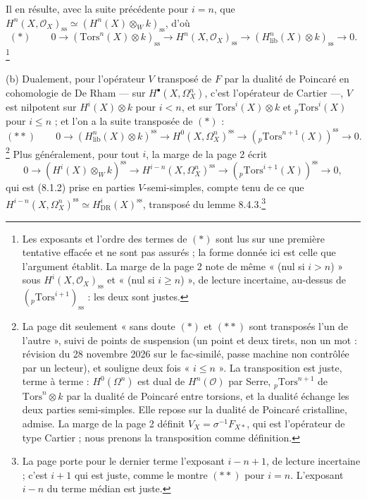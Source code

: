 \documentclass[11pt,a4paper]{article}
\begin{document}
Il en résulte, avec la suite précédente pour $i = n$, que
$H^{n}(X, \mathcal{O}_{X})_{\mathrm{ss}} \simeq (H^{n}(X) \otimes_{W}
k)_{\mathrm{ss}}$, d'où
\[
(*) \qquad 0 \to (\mathrm{Tors}^{n}(X) \otimes k)_{\mathrm{ss}}
\to H^{n}(X, \mathcal{O}_{X})_{\mathrm{ss}}
\to (H^{n}_{\mathrm{lib}}(X) \otimes k)_{\mathrm{ss}} \to 0 .
\]
\footnote{Les exposants et l'ordre des termes de $(*)$ sont lus sur une
première tentative effacée et ne sont pas assurés ; la forme donnée ici est
celle que l'argument établit. La marge de la page 2 note de même
« (nul si $i > n$) » sous $H^{i}(X, \mathcal{O}_{X})_{\mathrm{ss}}$ et
« (nul si $i \geq n$) », de lecture incertaine, au-dessus de
$({}_{p}\mathrm{Tors}^{i+1})_{\mathrm{ss}}$ : les deux sont justes.}

(b) Dualement, pour l'opérateur $V$ transposé de $F$ par la dualité de
Poincaré en cohomologie de De Rham --- sur $H^{\bullet}(X, \Omega^{n}_{X})$,
c'est l'opérateur de Cartier ---, $V$ est nilpotent sur
$H^{i}(X) \otimes k$ pour $i < n$, et sur $\mathrm{Tors}^{i}(X) \otimes k$ et
${}_{p}\mathrm{Tors}^{i}(X)$ pour $i \leq n$ ; et l'on a la suite transposée
de $(*)$ :
\[
(**) \qquad 0 \to (H^{n}_{\mathrm{lib}}(X) \otimes k)^{\mathrm{ss}}
\to H^{0}(X, \Omega^{n}_{X})^{\mathrm{ss}}
\to ({}_{p}\mathrm{Tors}^{n+1}(X))^{\mathrm{ss}} \to 0 .
\]
\footnote{La page dit seulement « sans doute $(*)$ et $(**)$ sont transposés
l'un de l'autre », suivi de points de suspension (un point et deux tirets,
non un mot : révision du 28 novembre 2026 sur le fac-similé, passe machine
non contrôlée par un lecteur), et souligne deux fois
« $i \leq n$ ». La transposition est juste, terme à terme : $H^{0}(\Omega^{n})$
est dual de $H^{n}(\mathcal{O})$ par Serre, ${}_{p}\mathrm{Tors}^{n+1}$ de
$\mathrm{Tors}^{n} \otimes k$ par la dualité de Poincaré entre torsions, et
la dualité échange les deux parties semi-simples. Elle repose sur la dualité
de Poincaré cristalline, admise. La marge de la page 2 définit
$V_{X} = \sigma^{-1} F_{X*}$, qui est l'opérateur de type Cartier ; nous
prenons la transposition comme définition.} Plus généralement, pour tout
$i$, la marge de la page 2 écrit
\[
0 \to (H^{i}(X) \otimes_{W} k)^{\mathrm{ss}} \to
H^{i-n}(X, \Omega^{n}_{X})^{\mathrm{ss}}
\to ({}_{p}\mathrm{Tors}^{i+1}(X))^{\mathrm{ss}} \to 0 ,
\]
qui est (8.1.2) prise en parties $V$-semi-simples, compte tenu de ce que
$H^{i-n}(X, \Omega^{n}_{X})^{\mathrm{ss}} \simeq
H^{i}_{\mathrm{DR}}(X)^{\mathrm{ss}}$, transposé du lemme
8.4.3.\footnote{La page porte pour le dernier terme l'exposant $i - n + 1$, de
lecture incertaine ; c'est $i + 1$ qui est juste, comme le montre $(**)$ pour
$i = n$. L'exposant $i - n$ du terme médian est juste.}
\end{document}
